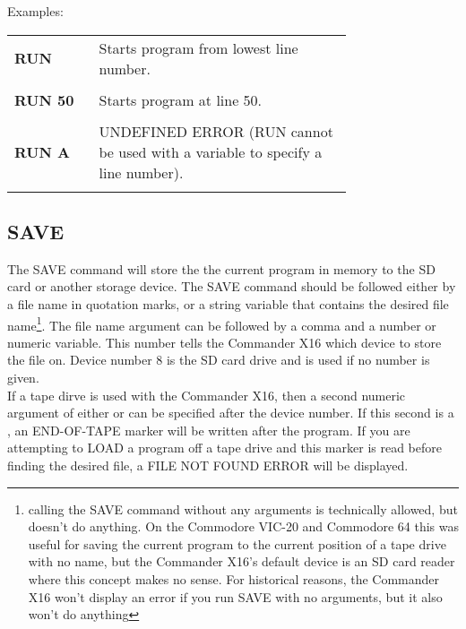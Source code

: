 Examples:\\

\begin{tabular}{l p{0.75\linewidth}}

	{\ttfamily\bfseries RUN}&Starts program from lowest line number.\\\\

	{\ttfamily\bfseries RUN 50}&Starts program at line 50.\\\\

	{\ttfamily\bfseries RUN A}&UNDEFINED ERROR ({\ttfamily RUN} cannot be used
	with a variable to specify a line number).\\\\

\end{tabular}

\subsection{SAVE}

The {\ttfamily SAVE} command will store the the current program in memory to
the SD card or another storage device.  The {\ttfamily SAVE} command should be
followed either by a file name in quotation marks, or a string variable that
contains the desired file name\footnote{calling the {\ttfamily SAVE} command
without any arguments is technically allowed, but doesn't do anything.  On the
Commodore VIC-20 and Commodore 64 this was useful for saving the current
program to the current position of a tape drive with no name, but the Commander
X16's default device is an SD card reader where this concept makes no sense.
For historical reasons, the Commander X16 won't display an error if you run
{\ttfamily SAVE} with no arguments, but it also won't do anything}.  The file
name argument can be followed by a comma and a number or numeric variable.
This number tells the Commander X16 which device to store the file on.  Device
number 8 is the SD card drive and is used if no number is given.\\

If a tape dirve is used with the Commander X16, then a second numeric argument
of either {} or {} can be specified after the device
number.  If this second is a {}, an {\ttfamily END-OF-TAPE} marker
will be written after the program.  If you are attempting to {\ttfamily LOAD} a
program off a tape drive and this marker is read before finding the desired
file, a {\ttfamily FILE NOT FOUND ERROR} will be displayed.\\

